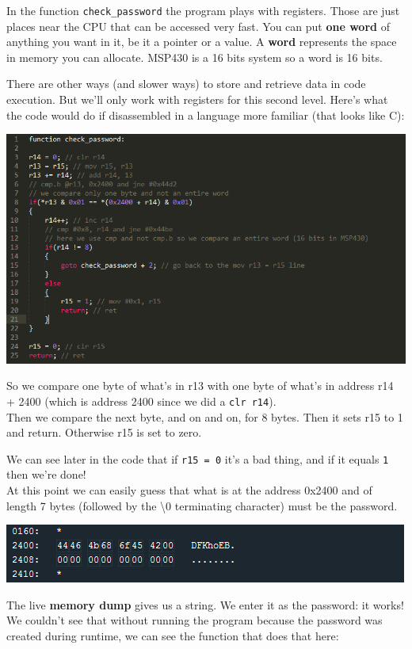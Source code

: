 \documentclass[a4paper,11pt]{article}
\begin{document}
In the function \texttt{check\_password} the program plays with
registers. Those are just places near the CPU that can be accessed very
fast. You can put \textbf{one word} of anything you want in it, be it a
pointer or a value. A \textbf{word} represents the space in memory you
can allocate. MSP430 is a 16 bits system so a word is 16 bits.

There are other ways (and slower ways) to store and retrieve data in
code execution. But we'll only work with registers for this second level.
Here's what the code would do if disassembled in a language more
familiar (that looks like C):

\includegraphics{img/code1_final.PNG}

So we compare one byte of what's in r13 with one byte of what's in
address r14 + 2400 (which is address 2400 since we did a
\texttt{clr r14}).\\Then we compare the next byte, and on and on, for 8
bytes. Then it sets r15 to 1 and return. Otherwise r15 is set to zero.

We can see later in the code that if \texttt{r15 = 0} it's a bad thing,
and if it equals \texttt{1} then we're done!\\At this point we can
easily guess that what is at the address 0x2400 and of length 7 bytes
(followed by the \textbackslash{}0 terminating character) must be the
password.

\includegraphics{img/1_6.png}

The live \textbf{memory dump} gives us a string. We enter it as the
password: it works!\\We couldn't see that without running the program
because the password was created during runtime, we can see the function
that does that here:
\end{document}

